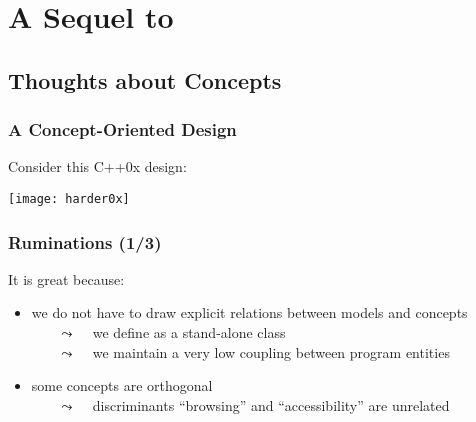 \section{A Sequel to \scoop}



\subsection{Thoughts about Concepts}



\begin{frame}
  \frametitle{A Concept-Oriented Design}

\vspace*{-2mm}
Consider this C++0x design:

\medskip

\texttt{[image: harder0x]}

\end{frame}



\begin{frame}
  \frametitle{Ruminations (1/3)}

It is great because:

\smallskip

  \begin{itemize}
  \item we do not have to draw explicit relations between models and concepts\\
    ~~~ {\scriptsize $\leadsto$ ~ we define \bfarrayiteratorT as a stand-alone class }\\
    ~~~ {\scriptsize $\leadsto$ ~ we maintain a very low coupling between program entities }
    \smallskip
  \item some concepts are orthogonal\\
    ~~~ {\scriptsize $\leadsto$ ~ discriminants ``browsing'' and ``accessibility'' are unrelated }
  \end{itemize}

\end{frame}




